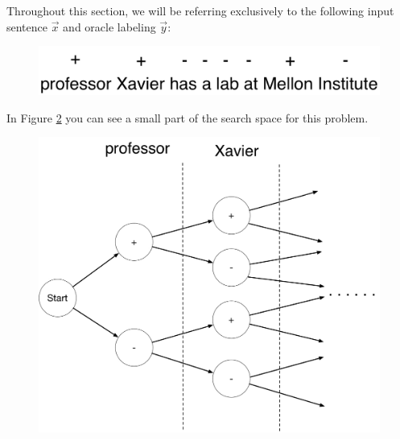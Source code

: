 \documentclass[11pt,addpoints,answers]{exam}
\numberwithin{equation}{section} %
\numberwithin{figure}{section} %
\numberwithin{table}{section} %
\begin{document}
Throughout this section, we will be referring exclusively to the following input sentence $\vec{x}$ and oracle labeling $\vec{y}$:

\begin{figure}[h]
\centering
\includegraphics[width=0.75\linewidth]{fig/x.jpg}
\label{example_sentence}
\end{figure}

In Figure \ref{state_space} you can see a small part of the search space for this problem. 

\begin{figure}[h]
\centering
\includegraphics[width=0.5\linewidth]{fig/state_space.jpg}
\caption{}
\label{state_space}
\end{figure}
\end{document}
